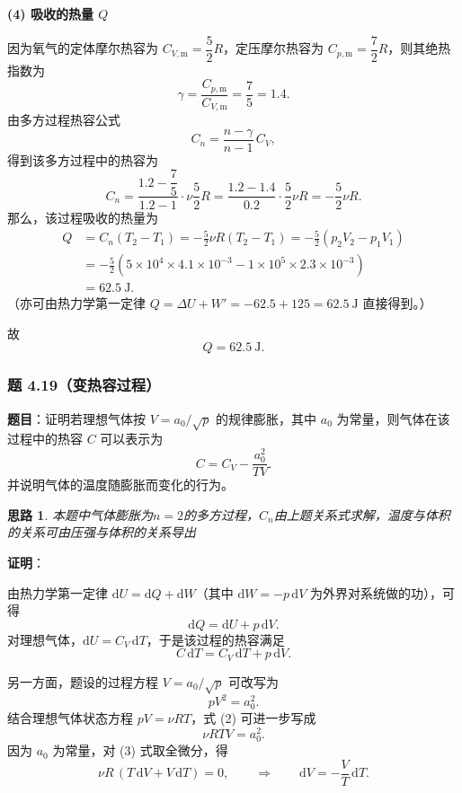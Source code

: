 \documentclass[UTF8]{ctexart}
\newtheorem{thoughts}{思路}[subsection]
\begin{document}
\textbf{(4) 吸收的热量 $Q$}

因为氧气的定体摩尔热容为 $C_{V,\mathrm{m}}=\dfrac{5}{2}R$，定压摩尔热容为 $C_{p,\mathrm{m}}=\dfrac{7}{2}R$，则其绝热指数为
\[
\gamma=\frac{C_{p,\mathrm{m}}}{C_{V,\mathrm{m}}}=\frac{7}{5}=1.4.
\]
由多方过程热容公式
\[
C_{n}=\frac{n-\gamma}{n-1}\,C_{V},
\]
得到该多方过程中的热容为
\[
C_{n}=\frac{1.2-\dfrac{7}{5}}{1.2-1}\cdot\nu\frac{5}{2}R
=\frac{1.2-1.4}{0.2}\cdot\frac{5}{2}\nu R
=-\frac{5}{2}\nu R.
\]
那么，该过程吸收的热量为
\begin{align*}
Q&=C_{n}(T_2-T_1)
=-\frac{5}{2}\nu R(T_2-T_1)
=-\frac{5}{2}(p_2V_2-p_1V_1) \\[4pt]
&=-\frac{5}{2}\left(5\times 10^4\times 4.1\times 10^{-3}
-1\times 10^5\times 2.3\times 10^{-3}\right) \\[4pt]
&=62.5\ \mathrm{J}.
\end{align*}
（亦可由热力学第一定律 $Q=\Delta U+W'=-62.5+125=62.5\ \mathrm{J}$ 直接得到。）

故
\[
\boxed{Q=62.5\ \mathrm{J}}.
\]


\subsubsection{题 4.19（变热容过程）}

\textbf{题目}：证明若理想气体按 $V=a_0/\sqrt{p}$ 的规律膨胀，其中 $a_0$ 为常量，则气体在该过程中的热容 $C$ 可以表示为
\[
C=C_V-\frac{a_0^2}{TV}.
\]
并说明气体的温度随膨胀而变化的行为。

\begin{thoughts}
  本题中气体膨胀为$n=2$的多方过程，$C_n$由上题关系式求解，温度与体积的关系可由压强与体积的关系导出
\end{thoughts}

\textbf{证明}：

由热力学第一定律 $\mathrm{d}U=\mathrm{d}Q+\mathrm{d}W$（其中 $\mathrm{d}W=-p\,\mathrm{d}V$ 为外界对系统做的功），可得
\[
\mathrm{d}Q=\mathrm{d}U+p\,\mathrm{d}V.
\]
对理想气体，$\mathrm{d}U=C_V\,\mathrm{d}T$，于是该过程的热容满足
\[
C\,\mathrm{d}T=C_V\,\mathrm{d}T+p\,\mathrm{d}V.
\tag{1}
\]

另一方面，题设的过程方程 $V=a_0/\sqrt{p}$ 可改写为
\[
pV^2=a_0^2.
\tag{2}
\]
结合理想气体状态方程 $pV=\nu RT$，式 (2) 可进一步写成
\[
\nu RTV=a_0^2.
\tag{3}
\]
因为 $a_0$ 为常量，对 (3) 式取全微分，得
\[
\nu R\,(T\,\mathrm{d}V+V\,\mathrm{d}T)=0,
\qquad\Longrightarrow\qquad
\mathrm{d}V=-\frac{V}{T}\,\mathrm{d}T.
\tag{4}
\]
\end{document}
